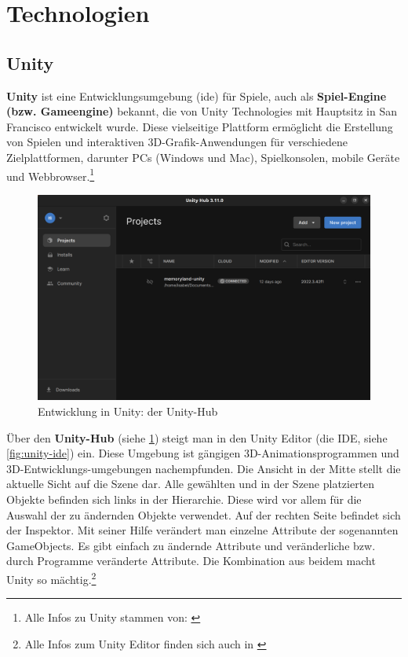 
\section{Technologien}

\subsection{Unity}

\textbf{Unity} ist eine Entwicklungsumgebung (\Gls{ide}) für Spiele, auch als \textbf{Spiel-Engine (bzw. Gameengine)} bekannt, die von Unity Technologies mit Hauptsitz in San Francisco entwickelt wurde. Diese vielseitige Plattform ermöglicht die Erstellung von Spielen und interaktiven 3D-Grafik-Anwendungen für verschiedene Zielplattformen, darunter PCs (Windows und Mac), Spielkonsolen, mobile Geräte und Webbrowser.\footnote{Alle Infos zu Unity stammen von: \cite{UnityDocs}}

\begin{figure} [h t]
    \centering
    \includegraphics[scale=0.15]{pics/unity-hub.png}
    \caption{Entwicklung in Unity: der Unity-Hub}
    \label{fig:unity-hub}
\end{figure}


Über den \textbf{Unity-Hub} (siehe \ref{fig:unity-hub}) steigt man in den Unity Editor (die IDE, siehe \ref{fig:unity-ide}) ein. Diese Umgebung ist gängigen 3D-Animationsprogrammen und 3D-Entwicklungs-umgebungen nachempfunden. Die Ansicht in der Mitte stellt die aktuelle Sicht auf die Szene dar. Alle gewählten und in der Szene platzierten Objekte befinden sich links in der Hierarchie. Diese wird vor allem für die Auswahl der zu ändernden Objekte verwendet. Auf der rechten Seite befindet sich der Inspektor. Mit seiner Hilfe verändert man einzelne Attribute der sogenannten GameObjects. Es gibt einfach zu ändernde Attribute und veränderliche bzw. durch Programme veränderte Attribute. Die Kombination aus beidem macht Unity so mächtig.\footnote{Alle Infos zum Unity Editor finden sich auch in \cite{UnityDocsEditor}}


